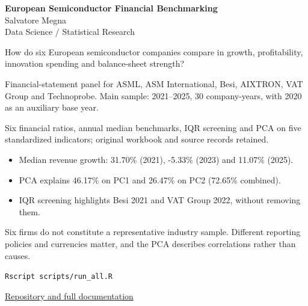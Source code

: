 \documentclass[12pt,a4paper]{article}
\begin{document}
\begin{center}
{\Large\bfseries European Semiconductor Financial Benchmarking}\\[0.65em]
{\normalsize Salvatore Megna}\\[0.25em]
{\small Data Science / Statistical Research}
\end{center}
\vspace{1.1em}
\par
\vspace{1.15em}
\par
How do six European semiconductor companies compare in growth, profitability, innovation spending and balance-sheet strength?
\par
\par
\vspace{1.15em}
\par
Financial-statement panel for ASML, ASM International, Besi, AIXTRON, VAT Group and Technoprobe. Main sample: 2021--2025, 30 company-years, with 2020 as an auxiliary base year.

Six financial ratios, annual median benchmarks, IQR screening and PCA on five standardized indicators; original workbook and source records retained.
\par
\par
\vspace{1.15em}
\par
\begin{itemize}
\item Median revenue growth: 31.70\% (2021), -5.33\% (2023) and 11.07\% (2025).
\item PCA explains 46.17\% on PC1 and 26.47\% on PC2 (72.65\% combined).
\item IQR screening highlights Besi 2021 and VAT Group 2022, without removing them.
\end{itemize}
\par
\par
\vspace{1.15em}
\par
Six firms do not constitute a representative industry sample. Different reporting policies and currencies matter, and the PCA describes correlations rather than causes.
\par
\par
\vspace{1.15em}
\par
\texttt{Rscript scripts/run\_all.R}
\par
\vfill
\noindent\small\href{https://github.com/Salvatore-Megna/european-semiconductor-benchmarking}{Repository and full documentation}
\end{document}
